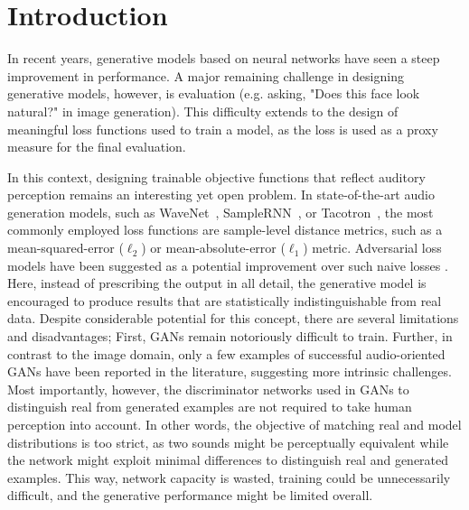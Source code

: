 \documentclass[sigconf]{acmart}
\begin{document}
%
\maketitle

\section{Introduction}

In recent years, generative models based on neural networks have seen a steep improvement in performance. A major remaining challenge in designing generative models, however, is evaluation (e.g. asking, "Does this face look natural?" in image generation). This difficulty extends to the design of meaningful loss functions used to train a model, as the loss is used as a proxy measure for the final evaluation.

In this context, designing trainable objective functions that reflect auditory perception remains an interesting yet open problem.  In state-of-the-art audio generation models, such as WaveNet~\cite{wavenet}, SampleRNN~\cite{samplernn}, or Tacotron~\cite{tacotron}, the most commonly employed loss functions are sample-level distance metrics, such as a mean-squared-error ($\ell_{2}$) or mean-absolute-error ($\ell_{1}$) metric.  Adversarial loss models have been suggested as a potential improvement over such naive losses \cite{wavegan,gan_music}. Here, instead of prescribing the output in all detail, the generative model is encouraged to produce results that are statistically indistinguishable from real data. Despite considerable potential for this concept, there are several limitations and disadvantages; First, GANs remain notoriously difficult to train. Further, in contrast to the image domain, only a few examples of successful audio-oriented GANs have been reported in the literature, suggesting more intrinsic challenges. Most importantly, however, the discriminator networks used in GANs to distinguish real from generated examples are not required to take human perception into account. In other words, the objective of matching  real and model distributions is too strict, as two sounds might be perceptually equivalent while the network might exploit minimal differences to distinguish real and generated examples. This way, network capacity is wasted, training could be unnecessarily difficult, and the generative performance might be limited overall.
\end{document}
